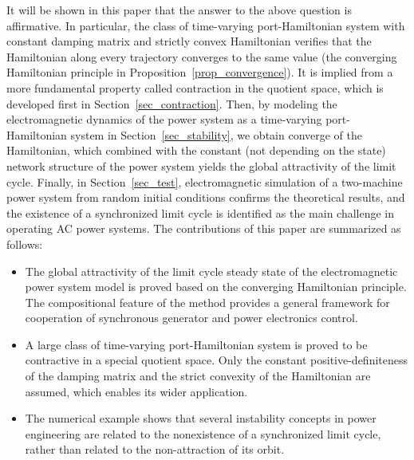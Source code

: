 It will be shown in this paper that the answer to the above question is affirmative. In particular, the class of time-varying port-Hamiltonian system with constant damping matrix and strictly convex Hamiltonian verifies that the Hamiltonian along every trajectory converges to the same value (the converging Hamiltonian principle in Proposition~\ref{prop_convergence}). %
It is implied from a more fundamental property called contraction in the quotient space, which is developed first in Section~\ref{sec_contraction}. 
Then, by modeling the electromagnetic dynamics of the power system as a time-varying port-Hamiltonian system in Section~\ref{sec_stability}, we obtain converge of the Hamiltonian, which combined with the constant (not depending on the state) network structure of the power system yields the global attractivity of the limit cycle. %
Finally, in Section~\ref{sec_test}, electromagnetic simulation of a two-machine power system from random initial conditions confirms the theoretical results, and the existence of a synchronized limit cycle is identified as the main challenge in operating AC power systems.
The contributions of this paper are summarized as follows:

\begin{itemize}
    \item The global attractivity of the limit cycle steady state of the electromagnetic power system model is proved based on the converging Hamiltonian principle. The compositional feature of the method provides a general framework for cooperation of synchronous generator and power electronics control.
    \item A large class of time-varying port-Hamiltonian system is proved to be contractive in a special quotient space. Only the constant positive-definiteness of the damping matrix and the strict convexity of the Hamiltonian are assumed, which enables its wider application.
    \item The numerical example shows that several instability concepts in power engineering are related to the nonexistence of a synchronized limit cycle, rather than related to the non-attraction of its orbit.
\end{itemize}

